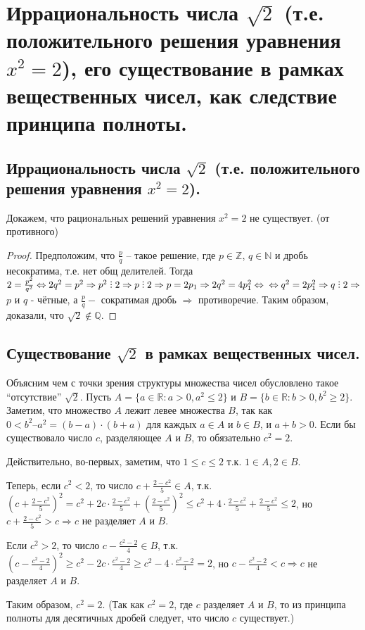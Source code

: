\documentclass[12pt]{article}
\DeclareRobustCommand{\divby}{%
  \mathrel{\vbox{\baselineskip.65ex\lineskiplimit0pt\hbox{.}\hbox{.}\hbox{.}}}%
}
\begin{document}
\section{Иррациональность числа $\sqrt{2}$ (т.е. положительного решения уравнения $x^2 = 2$), его существование в рамках вещественных чисел, как следствие принципа полноты.}

\subsection{Иррациональность числа $\sqrt{2}$ (т.е. положительного решения уравнения $x^2 = 2$).}

Докажем, что рациональных решений уравнения $x^2 = 2$ не существует.  (от противного)  
\begin{proof}
Предположим, что $\frac{p}{q}$ – такое решение, где $p \in \mathbb{Z}$, $q\in\mathbb{N}$ и дробь несократима, т.е. нет общ делителей.
Тогда $2 = \frac{p^2}{q^2} \Leftrightarrow 2q^2=p^2 \Rightarrow p^2\divby2\Rightarrow p\divby2\Rightarrow p = 2p_1 \Rightarrow 2q^2 = 4p_1^2 \Leftrightarrow \newline \Leftrightarrow q^2 = 2p_1^2 \Rightarrow q \divby2 \Rightarrow $ $p$ и $q$ - чётные, а $\frac{p}{q} - $ сократимая дробь $\Rightarrow$ противоречие.
Таким образом, доказали, что $\sqrt{2} \not\in \mathbb{Q}$.
\end{proof}

\subsection{Существование $\sqrt{2}$ в рамках вещественных чисел.}

	Объясним чем с точки зрения структуры множества чисел обусловлено такое “отсутствие” $\sqrt{2}$.
Пусть $A = \{a \in \mathbb{R}: a > 0, a^2 \leq 2\}$ и $B = \{b\in\mathbb{R}: b > 0, b^2 \geq 2\}$. Заметим, что множество $A$ лежит левее множества $B$, так как $0 < b^2 – a^2 = (b-a)\cdot(b+a)$ для каждых $a \in A$ и $b \in B$, и $a + b > 0$. Если бы существовало число $c$, разделяющее $A$ и $B$, то обязательно $c^2 = 2$. 

Действительно, во-первых, заметим, что $1 \leq c \leq 2$ т.к. $1 \in A, 2 \in B$.

Теперь, если $c^2 < 2$, то число $c + \frac{2-c^2}{5} \in A$, т.к. 
$(c+\frac{2-c^2}{5})^2 = c^2 + 2c \cdot \frac{2-c^2}{5} + (\frac{2-c^2}{5})^2 \leq c^2 + 4 \cdot\frac{2-c^2}{5} + \frac{2-c^2}{5}  \leq 2$, но $c + \frac{2-c^2}{5} > c \Rightarrow c$ не разделяет $A$ и $B$.

Если  $c^2 > 2$, то число $c - \frac{c^2-2}{4} \in B$, т.к.
$(c-\frac{c^2-2}{4})^2 \geq c^2 - 2c \cdot \frac{c^2-2}{4} \geq c^2 - 4 \cdot\frac{c^2-2}{4} = 2$, но $c - \frac{c^2-2}{4} < c \Rightarrow c$ не разделяет $A$ и $B$.

Таким образом, $c^2 = 2$. (Так как $c^2 = 2$, где $c$ разделяет $A$ и $B$, то из принципа полноты для десятичных дробей следует, что число $c$ существует.)
\end{document}

